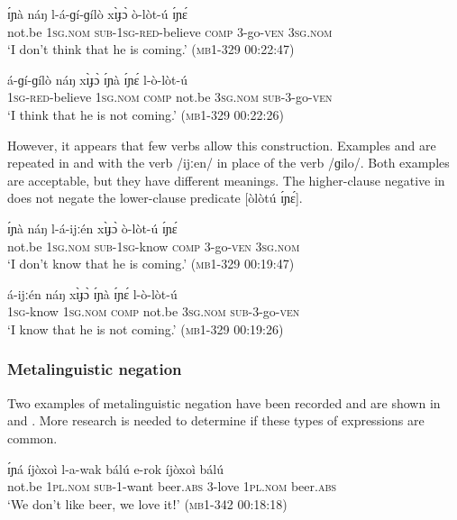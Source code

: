 \documentclass[output=paper,colorlinks,citecolor=brown,draftmode]{langscibook}
\begin{document}
\ea\label{ex:lop:107}
        \gll ɪ́ɲà náŋ l-á-ɡí-ɡílò xɪ̀ɟɔ̀ ò-lòt-ú ɪ́ɲɛ́ \\ 
             not.be \textsc{1sg.nom} \textsc{sub-}1\textsc{sg}{}-\textsc{red-}believe \textsc{comp} 3-go-\textsc{ven} 3\textsc{sg.nom} \\
        \glt ‘I don't think that he is coming.’ (\textsc{mb1-329} 00:22:47)
\z

\ea\label{ex:lop:108}
        \gll á-ɡí-ɡílò náŋ xɪ̀ɟɔ̀ ɪ́ɲà ɪ́ɲɛ́ l-ò-lòt-ú \\ 
             1\textsc{sg}{}-\textsc{red-}believe \textsc{1sg.nom} \textsc{comp} not.be 3\textsc{sg.nom} \textsc{sub}{}-3-go-\textsc{ven} \\
        \glt ‘I think that he is not coming.’    (\textsc{mb1-329} 00:22:26)
\z

However, it appears that few verbs allow this construction. Examples  and  are repeated in  and  with the verb /ijːen/ in place of the verb /ɡilo/. Both examples are acceptable, but they have different meanings. The higher-clause negative in  does not negate the lower-clause predicate [òlòtú ɪ́ɲɛ́].

\ea\label{ex:lop:109}
        \gll ɪ́ɲà náŋ l-á-ijːén xɪ̀ɟɔ̀ ò-lòt-ú ɪ́ɲɛ́ \\ 
             not.be \textsc{1sg.nom} \textsc{sub-}1\textsc{sg}{}-know \textsc{comp} 3-go-\textsc{ven} 3\textsc{sg.nom} \\
        \glt ‘I don't know that he is coming.’ (\textsc{mb1-329} 00:19:47)
\z

\ea\label{ex:lop:110}
        \gll á-ijːén náŋ xɪ̀ɟɔ̀ ɪ́ɲà ɪ́ɲɛ́ l-ò-lòt-ú \\ 
             1\textsc{sg}{}-know \textsc{1sg.nom} \textsc{comp} not.be 3\textsc{sg.nom} \textsc{sub}{}-3-go-\textsc{ven} \\
        \glt ‘I know that he is not coming.’    (\textsc{mb1-329} 00:19:26)
\z


\subsubsection{Metalinguistic negation}
\label{sec:lop:4.6.2}

Two examples of metalinguistic negation have been recorded and are shown in  and .  More research is needed to determine if these types of expressions are common.

\ea\label{ex:lop:111}
        \gll ɪ́ɲá  íjòxoì l-a-wak bálú e-rok íjòxoì bálú  \\ 
             not.be 1\textsc{pl.nom} \textsc{sub-1-}want beer\textsc{.abs} \textsc{3-}love 1\textsc{pl.nom} beer\textsc{.abs} \\
        \glt ‘We don't like beer, we love itǃ’ (\textsc{mb1-342} 00:18:18)
\z
\end{document}
